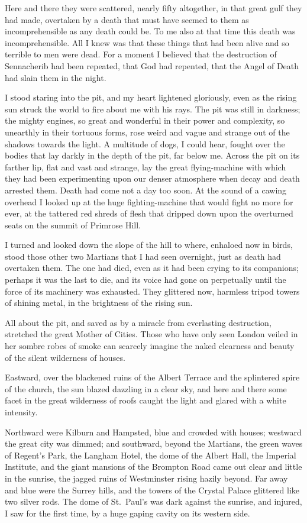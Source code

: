 Here and there they were scattered, nearly fifty altogether, in
that great gulf they had made, overtaken by a death that must have
seemed to them as incomprehensible as any death could be. To me
also at that time this death was incomprehensible. All I knew was
that these things that had been alive and so terrible to men were
dead. For a moment I believed that the destruction of Sennacherib
had been repeated, that God had repented, that the Angel of Death
had slain them in the night.

I stood staring into the pit, and my heart lightened gloriously,
even as the rising sun struck the world to fire about me with his
rays. The pit was still in darkness; the mighty engines, so great
and wonderful in their power and complexity, so unearthly in their
tortuous forms, rose weird and vague and strange out of the shadows
towards the light. A multitude of dogs, I could hear, fought over
the bodies that lay darkly in the depth of the pit, far below me.
Across the pit on its farther lip, flat and vast and strange, lay
the great flying-machine with which they had been experimenting
upon our denser atmosphere when decay and death arrested them.
Death had come not a day too soon. At the sound of a cawing
overhead I looked up at the huge fighting-machine that would fight
no more for ever, at the tattered red shreds of flesh that dripped
down upon the overturned seats on the summit of Primrose Hill.

I turned and looked down the slope of the hill to where, enhaloed
now in birds, stood those other two Martians that I had seen
overnight, just as death had overtaken them. The one had died, even
as it had been crying to its companions; perhaps it was the last to
die, and its voice had gone on perpetually until the force of its
machinery was exhausted. They glittered now, harmless tripod towers
of shining metal, in the brightness of the rising sun.

All about the pit, and saved as by a miracle from everlasting
destruction, stretched the great Mother of Cities. Those who have
only seen London veiled in her sombre robes of smoke can scarcely
imagine the naked clearness and beauty of the silent wilderness of
houses.

Eastward, over the blackened ruins of the Albert Terrace and the
splintered spire of the church, the sun blazed dazzling in a clear
sky, and here and there some facet in the great wilderness of roofs
caught the light and glared with a white intensity.

Northward were Kilburn and Hampsted, blue and crowded with houses;
westward the great city was dimmed; and southward, beyond the
Martians, the green waves of Regent's Park, the Langham Hotel, the
dome of the Albert Hall, the Imperial Institute, and the giant
mansions of the Brompton Road came out clear and little in the
sunrise, the jagged ruins of Westminster rising hazily beyond. Far
away and blue were the Surrey hills, and the towers of the Crystal
Palace glittered like two silver rods. The dome of St.\ Paul's was
dark against the sunrise, and injured, I saw for the first time, by
a huge gaping cavity on its western side.

